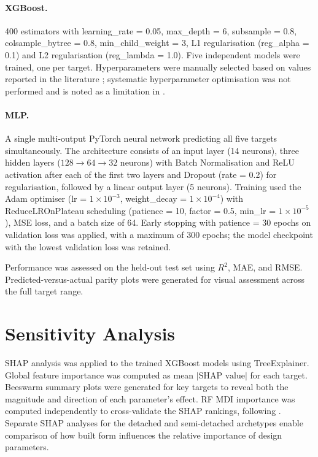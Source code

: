 \documentclass[12pt,a4paper]{report}
\begin{document}
\paragraph{XGBoost.} 400 estimators with learning\_rate = 0.05, max\_depth = 6, subsample = 0.8, colsample\_bytree = 0.8, min\_child\_weight = 3, L1 regularisation (reg\_alpha = 0.1) and L2 regularisation (reg\_lambda = 1.0). Five independent models were trained, one per target. Hyperparameters were manually selected based on values reported in the literature \citep{Botti2022,Shirzadi2025}; systematic hyperparameter optimisation was not performed and is noted as a limitation in .

\paragraph{MLP.} A single multi-output PyTorch neural network predicting all five targets simultaneously. The architecture consists of an input layer (14 neurons), three hidden layers ($128 \to 64 \to 32$ neurons) with Batch Normalisation and ReLU activation after each of the first two layers and Dropout (rate = 0.2) for regularisation, followed by a linear output layer (5 neurons). Training used the Adam optimiser (lr = $1 \times 10^{-3}$, weight\_decay = $1 \times 10^{-4}$) with ReduceLROnPlateau scheduling (patience = 10, factor = 0.5, min\_lr = $1 \times 10^{-5}$), MSE loss, and a batch size of 64. Early stopping with patience = 30 epochs on validation loss was applied, with a maximum of 300 epochs; the model checkpoint with the lowest validation loss was retained.

Performance was assessed on the held-out test set using $R^2$, MAE, and RMSE. Predicted-versus-actual parity plots were generated for visual assessment across the full target range.


\section{Sensitivity Analysis}
\label{sec:sensitivity}

SHAP analysis \citep{Lundberg2017} was applied to the trained XGBoost models using TreeExplainer. Global feature importance was computed as mean $|\text{SHAP value}|$ for each target. Beeswarm summary plots were generated for key targets to reveal both the magnitude and direction of each parameter's effect. RF MDI importance was computed independently to cross-validate the SHAP rankings, following \citet{BagheriEsfeh2025}. Separate SHAP analyses for the detached and semi-detached archetypes enable comparison of how built form influences the relative importance of design parameters.
\end{document}
